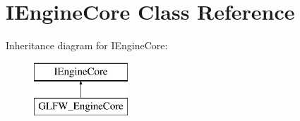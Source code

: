 \hypertarget{class_i_engine_core}{}\section{I\+Engine\+Core Class Reference}
\label{class_i_engine_core}
Inheritance diagram for I\+Engine\+Core\+:\begin{figure}[H]
\begin{center}
\leavevmode
\includegraphics[height=2.000000cm]{class_i_engine_core}
\end{center}
\end{figure}
